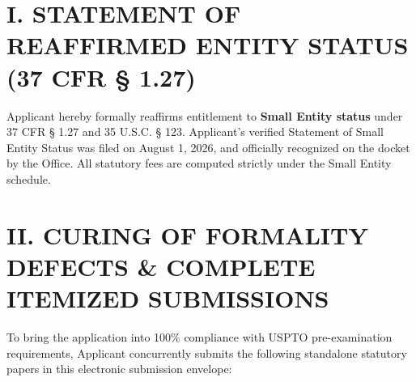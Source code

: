 \documentclass[11pt,letterpaper]{article}
\begin{document}
\section*{I. STATEMENT OF REAFFIRMED ENTITY STATUS (37 CFR \S{} 1.27)}

Applicant hereby formally reaffirms entitlement to \textbf{Small Entity status} under 37 CFR \S{} 1.27 and 35 U.S.C. \S{} 123. Applicant's verified Statement of Small Entity Status was filed on August 1, 2026, and officially recognized on the docket by the Office. All statutory fees are computed strictly under the Small Entity schedule.

\section*{II. CURING OF FORMALITY DEFECTS \& COMPLETE ITEMIZED SUBMISSIONS}

To bring the application into 100\% compliance with USPTO pre-examination requirements, Applicant concurrently submits the following standalone statutory papers in this electronic submission envelope:
\end{document}
